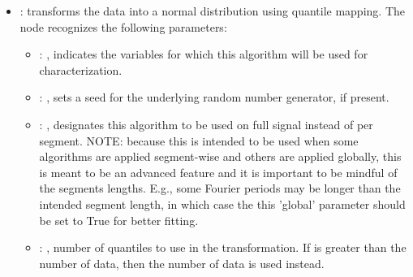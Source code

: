 \begin{itemize}
    \item {}:
      transforms the data into a normal distribution using quantile mapping.
      The  node recognizes the following parameters:
        \begin{itemize}
          \item {}: , 
            indicates the variables for which this algorithm will be used for characterization.
          \item {}: , 
            sets a seed for the underlying random number generator, if present.
          \item {}: , 
            designates this algorithm to be used on full signal instead of per
            segment. NOTE: because this is intended to be used when some algorithms are
            applied segment-wise and others are applied globally, this is meant to be an
            advanced feature and it is important to be mindful of the segments lengths.
            E.g., some Fourier periods may be longer than the intended segment length, in
            which case the this 'global' parameter should be set to True for better
            fitting. 
          \item {}: , 
            number of quantiles to use in the transformation. If 
            is greater than the number of data, then the number of data is used instead. 
      \end{itemize}


\end{itemize}
